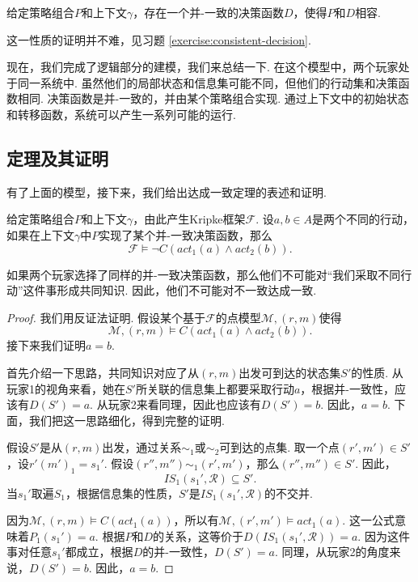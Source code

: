 \begin{proposition}\label{proposition:consistent-decision}
    给定策略组合$P$和上下文$\gamma$，存在一个并-一致的决策函数$D$，使得$P$和$D$相容. 
\end{proposition}

这一性质的证明并不难，见习题 \ref{exercise:consistent-decision}.

现在，我们完成了逻辑部分的建模，我们来总结一下. 在这个模型中，两个玩家处于同一系统中. 虽然他们的局部状态和信息集可能不同，但他们的行动集和决策函数相同. 决策函数是并-一致的，并由某个策略组合实现. 通过上下文中的初始状态和转移函数，系统可以产生一系列可能的运行. 

\subsection{定理及其证明}

有了上面的模型，接下来，我们给出达成一致定理的表述和证明. 

\begin{theorem}[Aumann达成一致定理]
给定策略组合$P$和上下文$\gamma$，由此产生Kripke框架$\mathcal{F}$. 设$a, b \in A$是两个不同的行动，如果在上下文$\gamma$中$P$实现了某个并-一致决策函数，那么
\[
\mathcal{F} \vDash \neg C(act_1(a) \wedge act_2(b)).
\]
\end{theorem}

如果两个玩家选择了同样的并-一致决策函数，那么他们不可能对“我们采取不同行动”这件事形成共同知识. 因此，他们不可能对不一致达成一致. 

\begin{proof}
我们用反证法证明. 假设某个基于$\mathcal{F}$的点模型$\mathcal{M}, (r,m)$使得
\[
\mathcal{M}, (r,m) \vDash C(act_1(a) \wedge act_2(b)).
\]
接下来我们证明$a=b$. 

首先介绍一下思路，共同知识对应了从$(r,m)$出发可到达的状态集$S'$的性质. 从玩家1的视角来看，她在$S'$所关联的信息集上都要采取行动$a$，根据并-一致性，应该有$D(S')=a$. 从玩家2来看同理，因此也应该有$D(S')=b$. 因此，$a=b$. 下面，我们把这一思路细化，得到完整的证明. 

假设$S'$是从$(r,m)$出发，通过关系$\sim_1$或$\sim_2$可到达的点集. 取一个点$(r',m') \in S'$，设$r'(m')_1 = s_1'$. 假设$(r'', m'') \sim_1 (r', m')$，那么$(r'', m'') \in S'$. 因此，
\[
IS_1(s_1', \mathcal{R}) \subseteq S'.
\]
当$s_1'$取遍$S_1$，根据信息集的性质，$S'$是$IS_1(s_1', \mathcal{R})$的不交并. 

因为$\mathcal{M}, (r,m) \vDash C(act_1(a))$，所以有$\mathcal{M}, (r',m') \vDash act_1(a)$. 这一公式意味着$P_1(s_1')=a$. 根据$P$和$D$的关系，这等价于$D(IS_1(s_1', \mathcal{R}))=a$. 因为这件事对任意$s_1'$都成立，根据$D$的并-一致性，$D(S')=a$. 同理，从玩家2的角度来说，$D(S')=b$. 因此，$a=b$. 
\end{proof}

